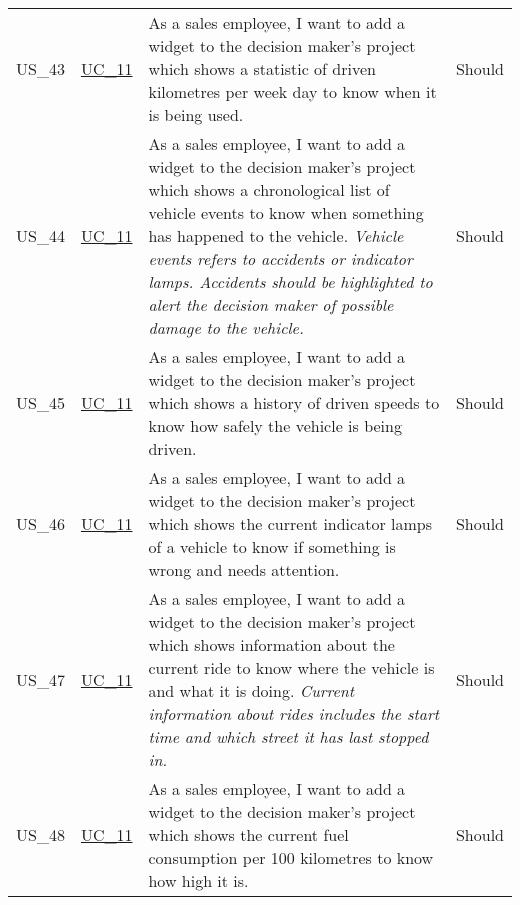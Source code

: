 \begin{footnotesize}
\begin{longtable}[L L L]{ p{} p{} p{} p{} }
      \rowcolor{Gray}
      \hypertarget{Ref:US43}{US\_43} & \hyperlink{Ref:UC11}{UC\_11} & As a sales employee, I want to add a \gls{widget} to the decision maker's project which shows a statistic of driven kilometres per week day to know when it is being used. & Should \\
      
      \hypertarget{Ref:US44}{US\_44} & \hyperlink{Ref:UC11}{UC\_11} & As a sales employee, I want to add a \gls{widget} to the decision maker's project which shows a chronological list of vehicle events to know when something has happened to the vehicle. 
      \newline
      \emph{Vehicle events refers to accidents or indicator lamps. Accidents should be highlighted to alert the decision maker of possible damage to the vehicle.} & Should
      \\

      \rowcolor{Gray}
      \hypertarget{Ref:US45}{US\_45} & \hyperlink{Ref:UC11}{UC\_11} & As a sales employee, I want to add a \gls{widget} to the decision maker's project which shows a history of driven speeds to know how safely the vehicle is being driven. & Should \\
      
      \hypertarget{Ref:US46}{US\_46} & \hyperlink{Ref:UC11}{UC\_11} & As a sales employee, I want to add a \gls{widget} to the decision maker's project which shows the current indicator lamps of a vehicle to know if something is wrong and needs attention. & Should \\
      
      \rowcolor{Gray}
      \hypertarget{Ref:US47}{US\_47} & \hyperlink{Ref:UC11}{UC\_11} & As a sales employee, I want to add a \gls{widget} to the decision maker's project which shows information about the current ride to know where the vehicle is and what it is doing.
      \newline
      \emph{Current information about rides includes the start time and which street it has last stopped in.} & Should \\
      
      \hypertarget{Ref:US48}{US\_48} & \hyperlink{Ref:UC11}{UC\_11} & As a sales employee, I want to add a \gls{widget} to the decision maker's project which shows the current fuel consumption per 100 kilometres to know how high it is. & Should \\
      \bottomrule
    \end{longtable}
  \end{footnotesize}
  \rmfamily

